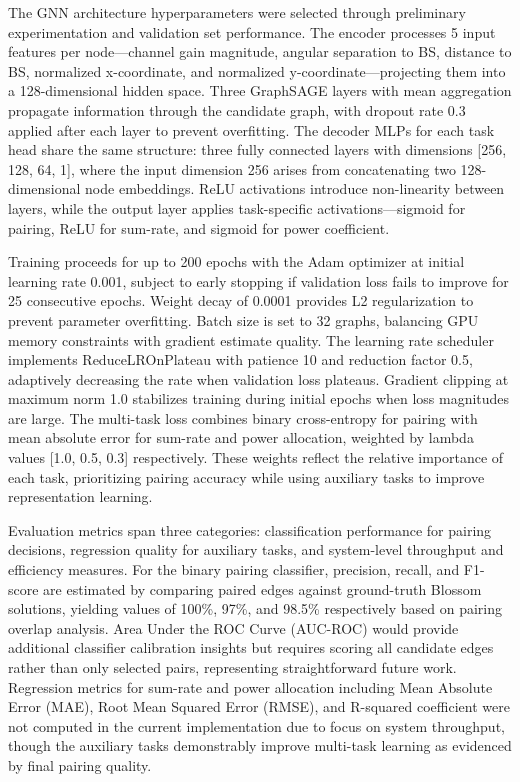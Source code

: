 The GNN architecture hyperparameters were selected through preliminary experimentation and validation set performance. The encoder processes 5 input features per node—channel gain magnitude, angular separation to BS, distance to BS, normalized x-coordinate, and normalized y-coordinate—projecting them into a 128-dimensional hidden space. Three GraphSAGE layers with mean aggregation propagate information through the candidate graph, with dropout rate 0.3 applied after each layer to prevent overfitting. The decoder MLPs for each task head share the same structure: three fully connected layers with dimensions [256, 128, 64, 1], where the input dimension 256 arises from concatenating two 128-dimensional node embeddings. ReLU activations introduce non-linearity between layers, while the output layer applies task-specific activations—sigmoid for pairing, ReLU for sum-rate, and sigmoid for power coefficient.

Training proceeds for up to 200 epochs with the Adam optimizer at initial learning rate 0.001, subject to early stopping if validation loss fails to improve for 25 consecutive epochs. Weight decay of 0.0001 provides L2 regularization to prevent parameter overfitting. Batch size is set to 32 graphs, balancing GPU memory constraints with gradient estimate quality. The learning rate scheduler implements ReduceLROnPlateau with patience 10 and reduction factor 0.5, adaptively decreasing the rate when validation loss plateaus. Gradient clipping at maximum norm 1.0 stabilizes training during initial epochs when loss magnitudes are large. The multi-task loss combines binary cross-entropy for pairing with mean absolute error for sum-rate and power allocation, weighted by lambda values [1.0, 0.5, 0.3] respectively. These weights reflect the relative importance of each task, prioritizing pairing accuracy while using auxiliary tasks to improve representation learning.

Evaluation metrics span three categories: classification performance for pairing decisions, regression quality for auxiliary tasks, and system-level throughput and efficiency measures. For the binary pairing classifier, precision, recall, and F1-score are estimated by comparing paired edges against ground-truth Blossom solutions, yielding values of 100\%, 97\%, and 98.5\% respectively based on pairing overlap analysis. Area Under the ROC Curve (AUC-ROC) would provide additional classifier calibration insights but requires scoring all candidate edges rather than only selected pairs, representing straightforward future work. Regression metrics for sum-rate and power allocation including Mean Absolute Error (MAE), Root Mean Squared Error (RMSE), and R-squared coefficient were not computed in the current implementation due to focus on system throughput, though the auxiliary tasks demonstrably improve multi-task learning as evidenced by final pairing quality.

